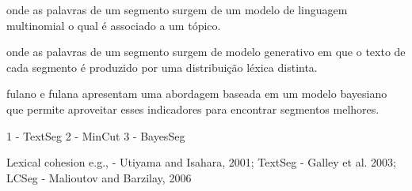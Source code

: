 onde as palavras de um segmento surgem de um modelo de linguagem multinomial o qual é associado a um tópico.

onde as palavras de um segmento surgem de modelo generativo em que o texto de cada segmento é produzido por uma distribuição léxica distinta. 



















fulano e fulana apresentam uma abordagem baseada em um modelo bayesiano que permite aproveitar esses indicadores para encontrar segmentos melhores.







1 - TextSeg
2 - MinCut
3 - BayesSeg


Lexical cohesion e.g., 
	- Utiyama and Isahara,     2001; {TextSeg}
	- Galley et al.            2003; {LCSeg}
	- Malioutov and Barzilay,  2006  {}





